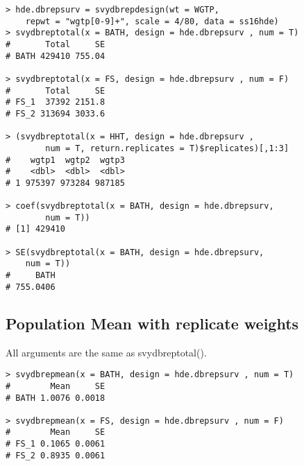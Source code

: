 \begin{lstlisting}
> hde.dbrepsurv = svydbrepdesign(wt = WGTP, 
    repwt = "wgtp[0-9]+", scale = 4/80, data = ss16hde)
> svydbreptotal(x = BATH, design = hde.dbrepsurv , num = T)
#       Total     SE
# BATH 429410 755.04

> svydbreptotal(x = FS, design = hde.dbrepsurv , num = F)
#       Total     SE
# FS_1  37392 2151.8
# FS_2 313694 3033.6

> (svydbreptotal(x = HHT, design = hde.dbrepsurv , 
        num = T, return.replicates = T)$replicates)[,1:3]
#    wgtp1  wgtp2  wgtp3
#    <dbl>  <dbl>  <dbl>
# 1 975397 973284 987185

> coef(svydbreptotal(x = BATH, design = hde.dbrepsurv,
        num = T))
# [1] 429410      

> SE(svydbreptotal(x = BATH, design = hde.dbrepsurv, 
    num = T))
#     BATH  
# 755.0406    
\end{lstlisting}
\subsection{Population Mean with replicate weights}
All arguments are the same as {\ttfamily svydbreptotal()}.
\begin{lstlisting}
> svydbrepmean(x = BATH, design = hde.dbrepsurv , num = T)
#        Mean     SE
# BATH 1.0076 0.0018

> svydbrepmean(x = FS, design = hde.dbrepsurv , num = F)
#        Mean     SE
# FS_1 0.1065 0.0061
# FS_2 0.8935 0.0061
\end{lstlisting}
